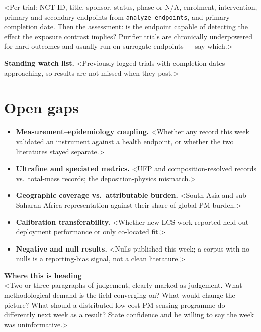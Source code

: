 \documentclass[10pt]{article}
\begin{document}
\vspace{1.5mm}
\footnotesize
<Per trial: NCT ID, title, sponsor, status, phase or N/A, enrolment, intervention,
primary and secondary endpoints from \texttt{analyze\_endpoints}, and primary completion
date. Then the assessment: is the endpoint capable of detecting the effect the exposure
contrast implies? Purifier trials are chronically underpowered for hard outcomes and
usually run on surrogate endpoints --- say which.>

\vspace{2mm}
\textbf{Standing watch list.} <Previously logged trials with completion dates approaching,
so results are not missed when they post.>

\clearpage

\section*{\sffamily\bfseries\color{Deep}Open gaps}
\vspace{-1.5mm}{\color{Teal}\rule{\linewidth}{1.1pt}}\vspace{2.5mm}

\footnotesize
\begin{itemize}
\item \textbf{Measurement--epidemiology coupling.} <Whether any record this week validated an
instrument against a health endpoint, or whether the two literatures stayed separate.>
\item \textbf{Ultrafine and speciated metrics.} <UFP and composition-resolved records vs.\
total-mass records; the deposition-physics mismatch.>
\item \textbf{Geographic coverage vs.\ attributable burden.} <South Asia and sub-Saharan
Africa representation against their share of global PM burden.>
\item \textbf{Calibration transferability.} <Whether new LCS work reported held-out
deployment performance or only co-located fit.>
\item \textbf{Negative and null results.} <Nulls published this week; a corpus with no nulls
is a reporting-bias signal, not a clean literature.>
\end{itemize}

\vspace{3mm}
\begin{keybox}
{\sffamily\bfseries\footnotesize\color{Deep}Where this is heading}\\[1.2mm]
\footnotesize
<Two or three paragraphs of judgement, clearly marked as judgement. What methodological
demand is the field converging on? What would change the picture? What should a
distributed low-cost PM sensing programme do differently next week as a result? State
confidence and be willing to say the week was uninformative.>
\end{keybox}
\end{document}
